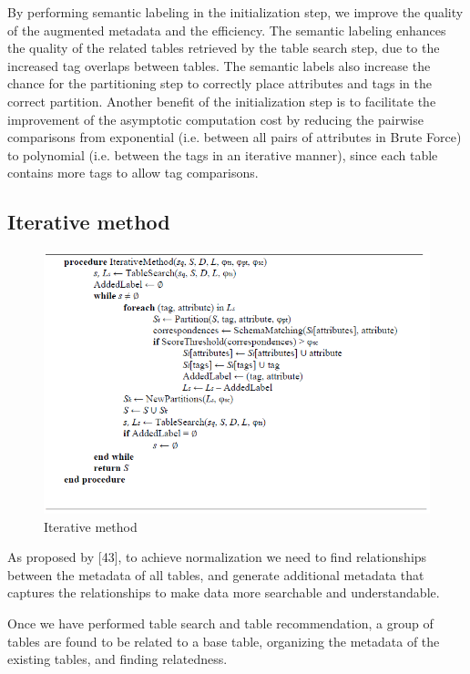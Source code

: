 By performing semantic labeling in the initialization step, we improve the quality of the augmented metadata and the efficiency. The semantic labeling enhances the quality of the related tables retrieved by the table search step, due to the increased tag overlaps between tables. The semantic labels also increase the chance for the partitioning step to correctly place attributes and tags in the correct partition. Another benefit of the initialization step is to facilitate the improvement of the asymptotic computation cost by reducing the pairwise comparisons from exponential (i.e. between all pairs of attributes in Brute Force) to polynomial (i.e. between the tags in an iterative manner), since each table contains more tags to allow tag comparisons.

\subsection{Iterative method}
\label{ssec:IterativeMethod}

\begin{figure}
  \centering
  \includegraphics[width=5in]{figures/iterative-method.png}
  \caption{Iterative method}
  \label{fig:iterative-method}
\end{figure}

As proposed by \cite{Smith2011Unity}[43], to achieve normalization we need to find relationships between the metadata of all tables, and generate additional metadata that captures the relationships to make data more searchable and understandable.

Once we have performed table search and table recommendation, a group of tables are found to be related to a base table, organizing the metadata of the existing tables, and finding relatedness.

